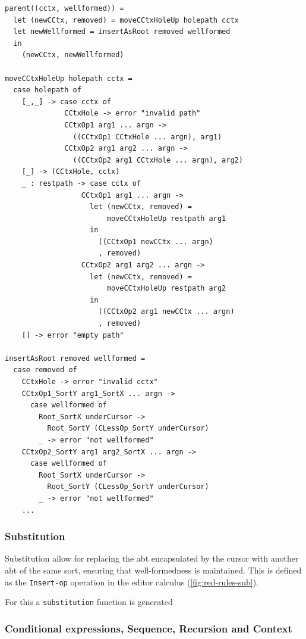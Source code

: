 \begin{lstlisting}[style=inline,caption={Pseudocode for applying parent operator},label={lst:cursor-movement-parent-pseudocode}]
parent((cctx, wellformed)) =
  let (newCCtx, removed) = moveCCtxHoleUp holepath cctx
  let newWellformed = insertAsRoot removed wellformed
  in
    (newCCtx, newWellformed)

moveCCtxHoleUp holepath cctx =
  case holepath of
    [_,_] -> case cctx of
              CCtxHole -> error "invalid path"
              CCtxOp1 arg1 ... argn -> 
                ((CCtxOp1 CCtxHole ... argn), arg1)
              CCtxOp2 arg1 arg2 ... argn -> 
                ((CCtxOp2 arg1 CCtxHole ... argn), arg2)
    [_] -> (CCtxHole, cctx)
    _ : restpath -> case cctx of
                  CCtxOp1 arg1 ... argn ->
                    let (newCCtx, removed) = 
                        moveCCtxHoleUp restpath arg1
                    in
                      ((CCtxOp1 newCCtx ... argn)
                      , removed)
                  CCtxOp2 arg1 arg2 ... argn ->
                    let (newCCtx, removed) = 
                        moveCCtxHoleUp restpath arg2
                    in
                      ((CCtxOp2 arg1 newCCtx ... argn)
                      , removed)
    [] -> error "empty path" 

insertAsRoot removed wellformed =
  case removed of
    CCtxHole -> error "invalid cctx"
    CCtxOp1_SortY arg1_SortX ... argn -> 
      case wellformed of
        Root_SortX underCursor ->
          Root_SortY (CLessOp_SortY underCursor)
        _ -> error "not wellformed"
    CCtxOp2_SortY arg1 arg2_SortX ... argn ->
      case wellformed of
        Root_SortX underCursor ->
          Root_SortY (CLessOp_SortY underCursor)
        _ -> error "not wellformed"
    ...
\end{lstlisting}

\subsubsection{Substitution}
Substitution allow for replacing the abt encapsulated by the cursor with another
abt of the same sort, ensuring that well-formedness is maintained.
This is defined as the \texttt{Insert-op} operation in the editor calculus
(\cref{fig:red-rules-sub}).

For this a \texttt{substitution} function is generated

\subsubsection{Conditional expressions, Sequence, Recursion and Context}

